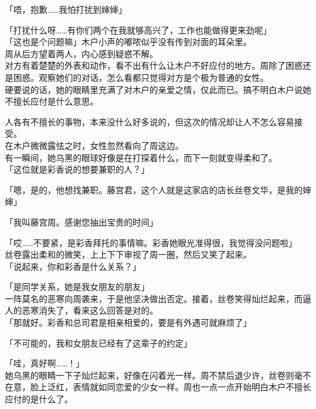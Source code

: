 「唔，抱歉……我怕打扰到婶婶」

「打扰什么呀……有你们两个在我就够高兴了，工作也能做得更来劲呢」\\

「这也是个问题嘛」木户小声的嘟哝似乎没有传到对面的耳朵里。\\

周从后方望着两人，内心感到疑惑不解。\\

对方有着楚楚的外表和动作，看不出有什么让木户不好应付的地方。周除了困惑还是困惑。观察她们的对话，怎么看都只觉得对方是个极为普通的女性。\\

硬要说的话，她的眼睛里充满了对木户的亲爱之情，仅此而已。搞不明白木户说她不擅长应付是什么意思。

人各有不擅长的事物，本来没什么好多说的，但这次的情况却让人不怎么容易接受。\\

在木户微微露怯之时，女性忽然看向了周这边。\\

有一瞬间，她乌黑的眼球好像是在打探着什么，而下一刻就变得柔和了。\\

「这位就是彩香说的想要兼职的人？」

「嗯，是的，他想找兼职。藤宫君，这个人就是这家店的店长丝卷文华，是我的婶婶」

「我叫藤宫周。感谢您抽出宝贵的时间」

「哎……不要紧，是彩香拜托的事情嘛。彩香她眼光准得很，我觉得没问题啦」\\

丝卷露出柔和的微笑，上上下下审视了周一圈，然后又笑了起来。\\

「说起来，你和彩香是什么关系？」

「是同学关系，她是我女朋友的朋友」\\

一阵莫名的恶寒向周袭来，于是他坚决做出否定。接着，丝卷笑得灿烂起来，而逼人的恶寒消失了，看来这么回答是对的。\\

「那就好。彩香和总司君是相亲相爱的，要是有外遇可就麻烦了」

「不可能的，我和女朋友已经有了这辈子的约定」

「哇，真好啊……！」\\

她乌黑的眼睛一下子灿烂起来，好像在闪着光一样。周不禁后退少许，丝卷则毫不在意，脸上泛红，表情就如同恋爱的少女一样。周也一点一点开始明白木户不擅长应付的是什么了。\\

